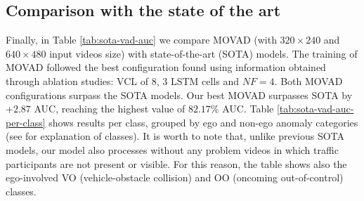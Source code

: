 \subsection{Comparison with the state of the art}
\label{comparison-with-sota}
Finally, in Table \ref{tab:sota-vad-auc} we compare MOVAD (with $320\times240$ and $640\times480$ input videos size) with state-of-the-art (SOTA) models.
The training of MOVAD followed the best configuration found using information obtained through ablation studies: VCL of 8, 3 LSTM cells and $\mathit{NF}=4$.
Both MOVAD configurations surpass the SOTA models.
Our best MOVAD surpasses SOTA by +$2.87$ AUC, reaching the highest value of $82.17\%$ AUC.
Table \ref{tab:sota-vad-auc-per-class} shows results per class, grouped by ego and non-ego anomaly categories (see \cite{9712446} for explanation of classes).
It is worth to note that, unlike previous SOTA models, our model also processes without any problem videos in which traffic participants are not present or visible. %
For this reason, the table shows also the ego-involved VO (vehicle-obstacle collision) and OO (oncoming out-of-control) classes.
